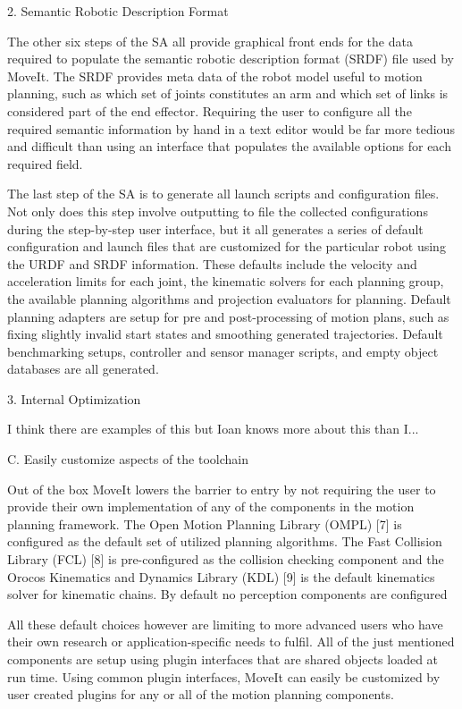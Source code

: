 \documentclass[10pt,journal,compsoc]{joser1}
\begin{document}
{2. Semantic Robotic Description Format

The other six steps of the SA all provide graphical front ends for the data required to populate the semantic robotic description format (SRDF) file used by MoveIt. The SRDF provides meta data of the robot model useful to motion planning, such as which set of joints constitutes an arm and which set of links is considered part of the end effector. Requiring the user to configure all the required semantic information by hand in a text editor would be far more tedious and difficult than using an interface that populates the available options for each required field.

The last step of the SA is to generate all launch scripts and configuration files. Not only does this step involve outputting to file the collected configurations during the step-by-step user interface, but it all generates a series of default configuration and launch files that are customized for the particular robot using the URDF and SRDF information. These defaults include the velocity and acceleration limits for each joint, the kinematic solvers for each planning group, the available planning algorithms and projection evaluators for planning. Default planning adapters are setup for pre and post-processing of motion plans, such as fixing slightly invalid start states and smoothing generated trajectories. Default benchmarking setups, controller and sensor manager scripts, and empty object databases are all generated. 

3. Internal Optimization

I think there are examples of this but Ioan knows more about this than I...

C. Easily customize aspects of the toolchain

Out of the box MoveIt lowers the barrier to entry by not requiring the user to provide their own implementation of any of the components in the motion planning framework. The Open Motion Planning Library (OMPL) [7] is configured as the default set of utilized planning algorithms. The Fast Collision Library (FCL) [8] is pre-configured as the collision checking component and the Orocos Kinematics and Dynamics Library (KDL) [9] is the default kinematics solver for kinematic chains. By default no perception components are configured

All these default choices however are limiting to more advanced users who have their own research or application-specific needs to fulfil. All of the just mentioned components are setup using plugin interfaces that are shared objects loaded at run time. Using common plugin interfaces, MoveIt can easily be customized by user created plugins for any or all of the motion planning components.

}
\end{document}
